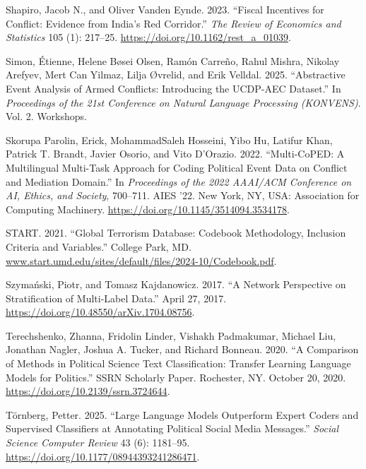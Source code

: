 \documentclass[
  11pt,
]{article}
\newlength{\cslhangindent}
\newenvironment{CSLReferences}[2] %
 {\begin{list}{}{%
  \setlength{\itemindent}{0pt}
  \setlength{\leftmargin}{0pt}
  \setlength{\parsep}{0pt}
  \ifodd #1
   \setlength{\leftmargin}{\cslhangindent}
   \setlength{\itemindent}{-1\cslhangindent}
  \fi
  \setlength{\itemsep}{#2\baselineskip}}}
 {\end{list}}
\begin{document}
\begin{CSLReferences}{1}{0}
Shapiro, Jacob N., and Oliver Vanden Eynde. 2023. {``Fiscal {Incentives}
for {Conflict}: {Evidence} from {India}'s {Red Corridor}.''} \emph{The
Review of Economics and Statistics} 105 (1): 217--25.
\url{https://doi.org/10.1162/rest_a_01039}.

Simon, Étienne, Helene Bøsei Olsen, Ramón Carreño, Rahul Mishra, Nikolay
Arefyev, Mert Can Yilmaz, Lilja Øvrelid, and Erik Velldal. 2025.
{``Abstractive {Event Analysis} of {Armed Conflicts}: {Introducing} the
{UCDP-AEC Dataset}.''} In \emph{Proceedings of the 21st {Conference} on
{Natural Language Processing} ({KONVENS})}. Vol. 2. Workshops.

Skorupa Parolin, Erick, MohammadSaleh Hosseini, Yibo Hu, Latifur Khan,
Patrick T. Brandt, Javier Osorio, and Vito D'Orazio. 2022.
{``Multi-{CoPED}: {A Multilingual Multi-Task Approach} for {Coding
Political Event Data} on {Conflict} and {Mediation Domain}.''} In
\emph{Proceedings of the 2022 {AAAI}/{ACM Conference} on {AI}, {Ethics},
and {Society}}, 700--711. {AIES} '22. New York, NY, USA: Association for
Computing Machinery. \url{https://doi.org/10.1145/3514094.3534178}.

START. 2021. {``Global {Terrorism Database}: {Codebook Methodology},
{Inclusion Criteria} and {Variables}.''} College Park, MD.
\href{https://www.start.umd.edu/sites/default/files/2024-10/Codebook.pdf}{www.start.umd.edu/sites/default/files/2024-10/Codebook.pdf}.

Szymański, Piotr, and Tomasz Kajdanowicz. 2017. {``A {Network
Perspective} on {Stratification} of {Multi-Label Data}.''} April 27,
2017. \url{https://doi.org/10.48550/arXiv.1704.08756}.

Terechshenko, Zhanna, Fridolin Linder, Vishakh Padmakumar, Michael Liu,
Jonathan Nagler, Joshua A. Tucker, and Richard Bonneau. 2020. {``A
{Comparison} of {Methods} in {Political Science Text Classification}:
{Transfer Learning Language Models} for {Politics}.''} SSRN Scholarly
Paper. Rochester, NY. October 20, 2020.
\url{https://doi.org/10.2139/ssrn.3724644}.

Törnberg, Petter. 2025. {``Large {Language Models Outperform Expert
Coders} and {Supervised Classifiers} at {Annotating Political Social
Media Messages}.''} \emph{Social Science Computer Review} 43 (6):
1181--95. \url{https://doi.org/10.1177/08944393241286471}.


\end{CSLReferences}
\end{document}
